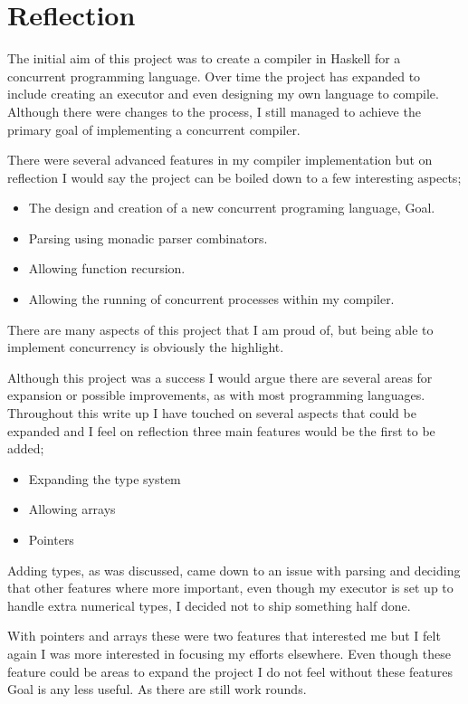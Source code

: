 \section{Reflection}

The initial aim of this project was to create a compiler in Haskell for a concurrent programming language. Over time the project has expanded to include creating an executor and even designing my own language to compile. Although there were changes to the process, I still managed to achieve the primary goal of implementing a concurrent compiler.

There were several advanced features in my compiler implementation but on reflection I would say the project can be boiled down to a few interesting aspects;

\begin{itemize}
\item The design and creation of a new concurrent programing language, Goal.
\item Parsing using monadic parser combinators.
\item Allowing function recursion. 
\item Allowing the running of concurrent processes within my compiler.
\end{itemize}

There are many aspects of this project that I am proud of, but being able to implement concurrency is obviously the highlight. 

Although this project was a success I would argue there are several areas for expansion or possible improvements, as with most programming languages. Throughout this write up I have touched on several aspects that could be expanded and I feel on reflection three main features would be the first to be added; 

\begin{itemize}
\item Expanding the type system
\item Allowing arrays 
\item Pointers
\end{itemize}    

Adding types, as was discussed, came down to an issue with parsing and deciding that other features where more important, even though my executor is set up to handle extra numerical types, I decided not to ship something half done.

With pointers and arrays these were two features that interested me but I felt again I was more interested in focusing my efforts elsewhere. Even though these feature could be areas to expand the project I do not feel without these features Goal is any less useful. As there are still work rounds.

